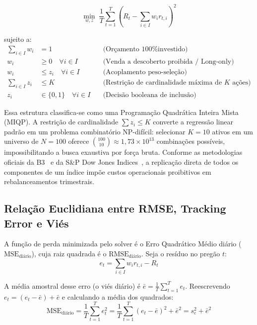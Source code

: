 \documentclass[11pt,a4paper]{article}
\begin{document}
\begin{equation}
\min_{w, z} \; \frac{1}{T} \sum_{t=1}^T \left( R_t - \sum_{i \in I} w_i r_{t,i} \right)^2
\label{eq:miqp_puro}
\end{equation}

\noindent sujeito a:
\begin{align}
\sum_{i \in I} w_i &= 1 \quad &\text{(Orçamento 100\% investido)} \\
w_i &\ge 0 \quad \forall i \in I \quad &\text{(Venda a descoberto proibida / Long-only)} \\
w_i &\le z_i \quad \forall i \in I \quad &\text{(Acoplamento peso-seleção)} \\
\sum_{i \in I} z_i &\le K \quad &\text{(Restrição de cardinalidade máxima de } K \text{ ações)} \\
z_i &\in \{0, 1\} \quad \forall i \in I \quad &\text{(Decisão booleana de inclusão)}
\end{align}

Essa estrutura classifica-se como uma Programação Quadrática Inteira Mista (MIQP). A restrição de cardinalidade $\sum z_i \le K$ converte a regressão linear padrão em um problema combinatório NP-difícil: selecionar $K = 10$ ativos em um universo de $N = 100$ oferece $\binom{100}{10} \approx 1,73 \times 10^{13}$ combinações possíveis, impossibilitando a busca exaustiva por força bruta. Conforme as metodologias oficiais da B3~\cite{b3_ibov_metodologia} e da S\&P Dow Jones Indices~\cite{sp_dow_jones_indices}, a replicação direta de todos os componentes de um índice impõe custos operacionais proibitivos em rebalanceamentos trimestrais.

\subsection{Relação Euclidiana entre RMSE, Tracking Error e Viés}
A função de perda minimizada pelo solver é o Erro Quadrático Médio diário ($\text{MSE}_{\text{diário}}$), cuja raiz quadrada é o $\text{RMSE}_{\text{diário}}$. Seja o resíduo no pregão $t$:
\begin{equation}
e_t = \sum_{i \in I} w_i r_{t,i} - R_t
\end{equation}

A média amostral desse erro (o viés diário) é $\bar{e} = \frac{1}{T} \sum_{t=1}^T e_t$. Reescrevendo $e_t = (e_t - \bar{e}) + \bar{e}$ e calculando a média dos quadrados:
\begin{equation}
\text{MSE}_{\text{diário}} = \frac{1}{T} \sum_{t=1}^T e_t^2 = \frac{1}{T} \sum_{t=1}^T (e_t - \bar{e})^2 + \bar{e}^2 = s_e^2 + \bar{e}^2
\end{equation}
\end{document}
